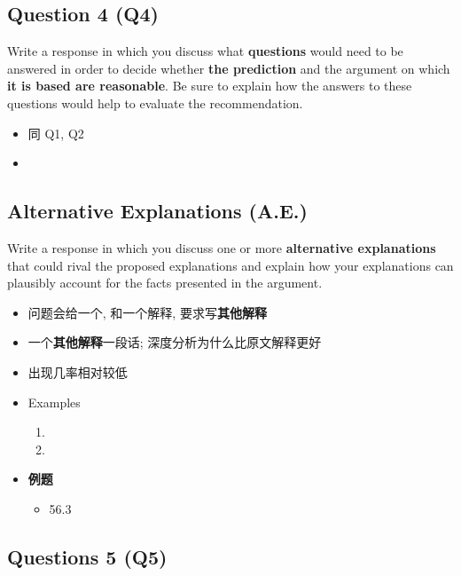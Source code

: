   \subsection{Question 4 (Q4)}

    Write a response in which you discuss what \textbf{questions} would need
    to be answered in order to decide whether \textbf{the prediction} and
    the argument on which \textbf{it is based are reasonable}.
    Be sure to explain how the answers to these questions would help to
    evaluate the recommendation.

    \begin{itemize}
      \item 同 Q1, Q2
      \item {}
    \end{itemize}

  \subsection{Alternative Explanations (A.E.)}

    Write a response in which you discuss one or more
    \textbf{alternative explanations} that could rival the proposed
    explanations and explain how your explanations can plausibly account for
    the facts presented in the argument.

    \begin{itemize}
      \item 问题会给一个, 和一个解释, 要求写\textbf{其他解释}
      \item 一个\textbf{其他解释}一段话; 深度分析为什么比原文解释更好
      \item 出现几率相对较低
      \item Examples
      \begin{enumerate}
        \item {}
        \item {}
      \end{enumerate}

      \item \textbf{例题}
      \begin{itemize}
        \item 56.3
      \end{itemize}
    \end{itemize}

  \subsection{Questions 5 (Q5)}

